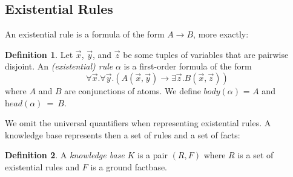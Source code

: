 \documentclass{article}
\newtheorem{proposition}{Proposition}[section]
\theoremstyle{definition}
\newtheorem{definition}{Definition}[section]
\theoremstyle{remark}
\begin{document}




\subsection{Existential Rules}


An existential rule is a formula of the form $A \rightarrow B$, more exactly:

\begin{definition}
Let $\vec x$, $\vec y$, and $\vec z$ be some tuples of variables that are pairwise disjoint. An \emph{(existential) rule} $\alpha$ is a first-order formula	of the form $$\forall \vec x.\forall \vec y.( A(\vec x,\vec y) \rightarrow \exists \vec z. B(\vec x,\vec z))$$ where $A$ and $B$ are conjunctions of atoms. We define \emph{$\textit{body}(\alpha)$} = $A$ and \emph{$\textit{head}(\alpha)$}~=~$B$.
\end{definition}
We omit the universal quantifiers when representing existential rules. A knowledge base represents then a set of rules and a set of facts:

\begin{definition}
A \emph{knowledge base} $K$ is a pair $(R,F)$ where $R$ is a set of existential rules and $F$ is a  ground factbase.
\end{definition}
\end{document}
